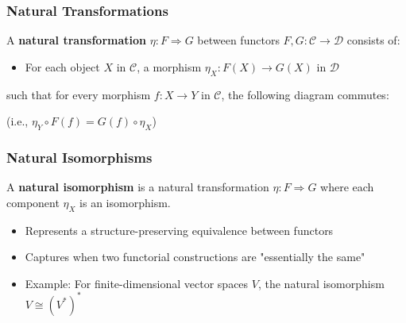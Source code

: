 \documentclass{beamer}
\begin{document}
\begin{frame}[fragile]
    \frametitle{Natural Transformations}
    \begin{definition}
        A \textbf{natural transformation} $\eta: F \Rightarrow G$ between functors $F, G: \mathcal{C} \to \mathcal{D}$ consists of:
        \begin{itemize}
            \item For each object $X$ in $\mathcal{C}$, a morphism $\eta_X: F(X) \to G(X)$ in $\mathcal{D}$
        \end{itemize}
        such that for every morphism $f: X \to Y$ in $\mathcal{C}$, the following diagram commutes:
        \begin{center}
        \end{center}
        (i.e., $\eta_Y \circ F(f) = G(f) \circ \eta_X$)
    \end{definition}
\end{frame}

\begin{frame}[fragile]
\frametitle{Natural Isomorphisms}
    \begin{definition}
        A \textbf{natural isomorphism} is a natural transformation $\eta: F \Rightarrow G$ where each component $\eta_X$ is an isomorphism.
    \end{definition}
    
    \begin{center}
    \end{center}
    
    \begin{itemize}
        \item Represents a structure-preserving equivalence between functors
        \item Captures when two functorial constructions are "essentially the same"
        \item Example: For finite-dimensional vector spaces $V$, the natural isomorphism $V \cong (V^*)^*$
    \end{itemize}
\end{frame}
\end{document}
